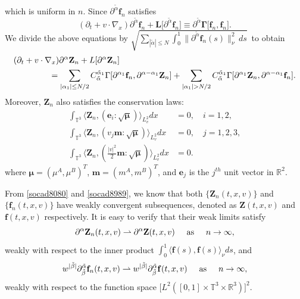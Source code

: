 \documentclass[reqno]{amsart}
\numberwithin{equation}{section}
\numberwithin{equation}{section}
\begin{document}
		which is uniform in $ n $. Since $ \partial^{\tilde{\alpha}} \mathbf{f}_n $ satisfies
		$$
		(\partial_t + v \cdot \nabla_x) 
		 \partial^{\tilde{\alpha}} \mathbf{f}_n + \mathbf{L}\big[\partial^{\tilde{\alpha}} \mathbf{f}_n\big] \equiv \partial^{\tilde{\alpha}} \bm{\Gamma}\big[\mathbf{f}_n, \mathbf{f}_n\big].
		$$
		We divide the above equations  by $ \sqrt{\sum_{|\tilde{\alpha}| \le N} \int_0^1 \| \partial^{\tilde{\alpha}} \mathbf{f}_n(s) \|_{\nu}^2 \,ds}$\,  to obtain
		\begin{align}
			&(\partial_t + v \cdot \nabla_x) \partial^\alpha \mathbf{Z}_n + L[\partial^\alpha \mathbf{Z}_n]\notag \\
			&\hspace{1.5cm}= \sum_{|\alpha_1| \le N/2} C_{\tilde{\alpha}}^{\tilde{\alpha}_1} \Gamma[\partial^{\alpha_1} \mathbf{f}_n, \partial^{\alpha - \alpha_1} \mathbf{Z}_n] + \sum_{|\alpha_1| > N/2} C_{\tilde{\alpha}}^{\tilde{\alpha}_1} \Gamma[\partial^{\alpha_1} \mathbf{Z}_n, \partial^{\alpha - \alpha_1} \mathbf{f}_n]. \label{socaed9090}
		\end{align}
		Moreover, $\mathbf{Z}_n$ also satisfies the conservation laws:
		\begin{equation}\label{coserforZZZ}
			\begin{aligned}
				\int_{\mathbb{T}^3} \big\langle \mathbf{Z}_n, (\mathbf{e}_i:\sqrt{\bm{\mu}}) \big\rangle_{L_v^2}  dx  &= 0, \quad i=1,2,\\
				\int_{\mathbb{T}^3} \big\langle \mathbf{Z}_n, (v_j \mathbf{m}:\sqrt{\bm{\mu}}) \big\rangle_{L_v^2} dx &= 0, \quad j=1,2,3,\\
				\int_{\mathbb{T}^3} \big\langle \mathbf{Z}_n,( \frac{|v|^2}{2}\mathbf{m}:\sqrt{\bm{\mu}})   \big\rangle_{L_v^2}dx &= 0.
			\end{aligned}
		\end{equation}
		where $\bm{\mu}=(\mu^A,\mu^B)^T$, $\mathbf{m} = (m^A,m^B )^T$, and $ \mathbf{e}_j$ is the $j^{th}$ unit vector in $\mathbb{R}^2$.
		
		From \eqref{socad8080} and \eqref{socad8989}, we know that both $\{\mathbf{Z}_n(t,x,v)\}$ and $\{\mathbf{f}_n(t,x,v)\}$ have weakly convergent subsequences, denoted as 
		$\mathbf{Z}(t,x,v)$ and $\mathbf{f}(t,x,v)$ respectively. It is easy to verify that their weak limits satisfy
		\begin{equation*}
			\partial^\alpha \mathbf{Z}_n(t,x,v) \rightharpoonup \partial^\alpha \mathbf{Z}(t,x,v)\hspace{0.5cm}  \text{as}\hspace{0.5cm}   n \to \infty ,
		\end{equation*}
		  weakly with respect to the inner product $ \int_0^1 \langle \mathbf{f}(s), \mathbf{f}(s) \rangle_{\nu} ds $, and
		\begin{equation*}
		 w^{| \tilde{\beta} |} \partial_{\tilde{\beta}}^{\tilde{\alpha}} \mathbf{f}_n(t,x,v) \rightharpoonup  w^{| \tilde{\beta} |} \partial_{\tilde{\beta}}^{\tilde{\alpha}} \mathbf{f}(t,x,v) \hspace{0.5cm}  \text{as}\hspace{0.5cm}   n \to \infty ,
		\end{equation*}
		weakly with respect to the function space $ \big[L^2([0,1] \times \mathbb{T}^3 \times \mathbb{R}^3)\big]^2$.
		
\end{document}
